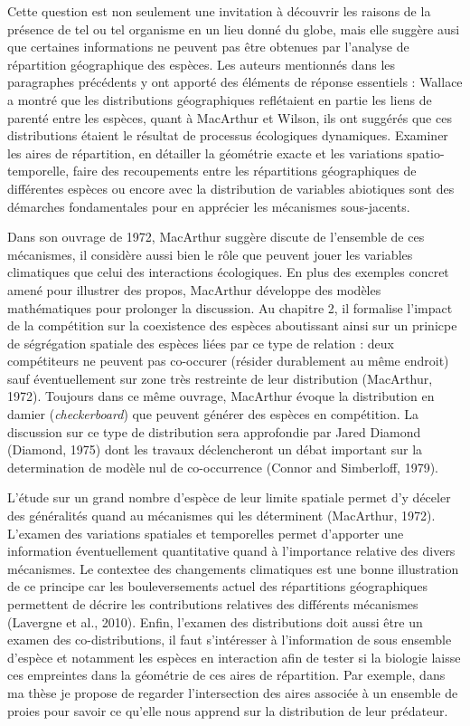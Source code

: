 Cette question est non seulement une invitation à découvrir les raisons
de la présence de tel ou tel organisme en un lieu donné du globe, mais
elle suggère ausi que certaines informations ne peuvent pas être
obtenues par l'analyse de répartition géographique des espèces. Les
auteurs mentionnés dans les paragraphes précédents y ont apporté des
éléments de réponse essentiels : Wallace a montré que les distributions
géographiques reflétaient en partie les liens de parenté entre les
espèces, quant à MacArthur et Wilson, ils ont suggérés que ces
distributions étaient le résultat de processus écologiques dynamiques.
Examiner les aires de répartition, en détailler la géométrie exacte et
les variations spatio-temporelle, faire des recoupements entre les
répartitions géographiques de différentes espèces ou encore avec la
distribution de variables abiotiques sont des démarches fondamentales
pour en apprécier les mécanismes sous-jacents.

Dans son ouvrage de 1972, MacArthur suggère discute de l'ensemble de ces
mécanismes, il considère aussi bien le rôle que peuvent jouer les
variables climatiques que celui des interactions écologiques. En plus
des exemples concret amené pour illustrer des propos, MacArthur
développe des modèles mathématiques pour prolonger la discussion. Au
chapitre 2, il formalise l'impact de la compétition sur la coexistence
des espèces aboutissant ainsi sur un prinicpe de ségrégation spatiale
des espèces liées par ce type de relation : deux compétiteurs ne peuvent
pas co-occurer (résider durablement au même endroit) sauf éventuellement
sur zone très restreinte de leur distribution (MacArthur, 1972).
Toujours dans ce même ouvrage, MacArthur évoque la distribution en
damier (\emph{checkerboard}) que peuvent générer des espèces en
compétition. La discussion sur ce type de distribution sera approfondie
par Jared Diamond (Diamond, 1975) dont les travaux déclencheront un
débat important sur la determination de modèle nul de co-occurrence
(Connor and Simberloff, 1979).

L'étude sur un grand nombre d'espèce de leur limite spatiale permet d'y
déceler des généralités quand au mécanismes qui les déterminent
(MacArthur, 1972). L'examen des variations spatiales et temporelles
permet d'apporter une information éventuellement quantitative quand à
l'importance relative des divers mécanismes. Le contextee des
changements climatiques est une bonne illustration de ce principe car
les bouleversements actuel des répartitions géographiques permettent de
décrire les contributions relatives des différents mécanismes (Lavergne
et al., 2010). Enfin, l'examen des distributions doit aussi être un
examen des co-distributions, il faut s'intéresser à l'information de
sous ensemble d'espèce et notamment les espèces en interaction afin de
tester si la biologie laisse ces empreintes dans la géométrie de ces
aires de répartition. Par exemple, dans ma thèse je propose de regarder
l'intersection des aires associée à un ensemble de proies pour savoir ce
qu'elle nous apprend sur la distribution de leur prédateur.

